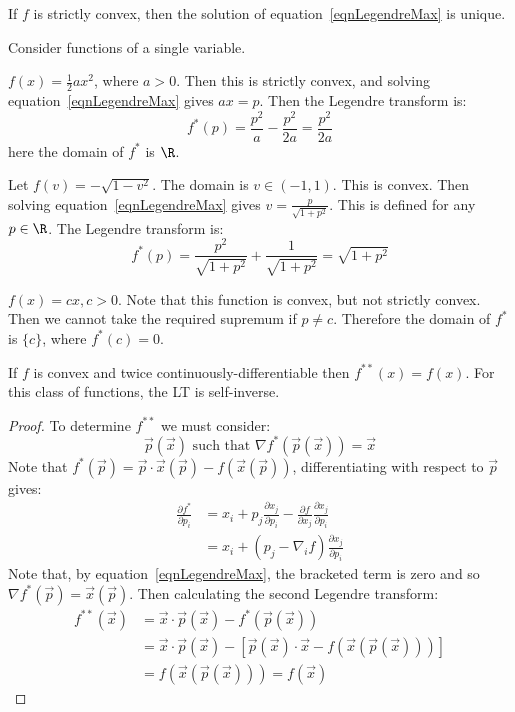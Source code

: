\documentclass[../Main.tex]{subfiles}
\begin{document}
\begin{remark}
    If $f$ is strictly convex, then the solution of equation~\ref{eqnLegendreMax} is unique.
\end{remark}
\begin{examples}{
        Consider functions of a single variable.
    }
    \item $f(x) = \frac{1}{2} ax^2$, where $a > 0$. Then this is strictly convex, and solving equation~\ref{eqnLegendreMax} gives $ax = p$. Then the Legendre transform is:
        \begin{equation*}
            f^*(p) = \frac{p^2}{a} - \frac{p^2}{2a} = \frac{p^2}{2a}
        \end{equation*}
        here the domain of $f^*$ is $\R$.
    \item Let $f(v) = -\sqrt{1 - v^2}$. The domain is $v \in (-1, 1)$. This is convex. Then solving equation~\ref{eqnLegendreMax} gives $v = \frac{p}{\sqrt{1 + p^2}}$. This is defined for any $p \in \R$. The Legendre transform is:
        \begin{equation*}
            f^*(p) = \frac{p^2}{\sqrt{1 + p^2}} + \frac{1}{\sqrt{1 + p^2}} = \sqrt{1 + p^2}
        \end{equation*}
    \item $f(x) = cx, c > 0$. Note that this function is convex, but not strictly convex. Then we cannot take the required supremum if $p \neq c$. Therefore the domain of $f^*$ is $\{c\}$, where $f^*(c) = 0$. \label{exLineLT}
\end{examples}
\begin{theorem}
    If $f$ is convex and twice continuously-differentiable then $f^{**}(x) = f(x)$. For this class of functions, the LT is self-inverse.
\end{theorem}
\begin{proof}
    To determine $f^{**}$ we must consider:
    \begin{equation*}
        \vec{p}(\vec{x}) \text{ such that } \nabla f^*(\vec{p}(\vec{x})) = \vec{x}
    \end{equation*}
    Note that $f^*(\vec{p}) = \vec{p} \cdot \vec{x}(\vec{p}) - f(\vec{x}(\vec{p}))$, differentiating with respect to $\vec{p}$ gives:
    \begin{align*}
        \frac{\partial f^*}{\partial p_i} &= x_i + p_j \frac{\partial x_j}{\partial p_i} - \frac{\partial f}{\partial x_j} \frac{\partial x_j}{\partial p_i} \\
        &= x_i + \left(p_j - \nabla_i f\right) \frac{\partial x_j}{\partial p_i}
    \end{align*}
    Note that, by equation~\ref{eqnLegendreMax}, the bracketed term is zero and so $\nabla f^*(\vec{p}) = \vec{x}(\vec{p})$. Then calculating the second Legendre transform:
    \begin{align*}
        f^{**}(\vec{x}) &= \vec{x} \cdot \vec{p}(\vec{x}) - f^*(\vec{p}(\vec{x})) \\
        &= \vec{x} \cdot \vec{p}(\vec{x}) - \left[\vec{p}(\vec{x}) \cdot \vec{x} - f(\vec{x}(\vec{p}(\vec{x})))\right] \\
        &= f(\vec{x}(\vec{p}(\vec{x}))) = f(\vec{x})
    \end{align*}
\end{proof}
\end{document}
